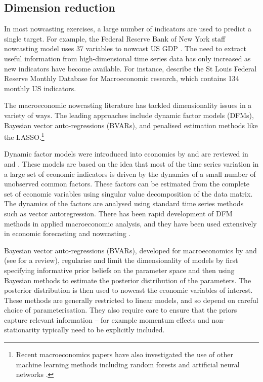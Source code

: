 \documentclass[a4paper, 12pt]{article}
\theoremstyle{remark}
\begin{document}
\subsection{Dimension reduction} \label{subsec:dimension}

In most nowcasting exercises, a large number of indicators are used to predict a single target.
For example, the Federal Reserve Bank of New York staff nowcasting model uses 37 variables to nowcast US GDP \citep{FRBNY}. The need to extract useful information from high-dimensional time series data has only increased as new indicators have become available. For instance, \citet{mccracken2016fred} describe the St Louis Federal Reserve Monthly Database for Macroeconomic research, which contains 134 monthly US indicators.

The macroeconomic nowcasting literature has tackled dimensionality issues in a variety of ways. The leading approaches include dynamic factor models (DFMs), Bayesian vector auto-regressions (BVARs), and penalised estimation methods like the LASSO.\footnote{Recent macroeconomics papers have also investigated the use of other machine learning methods including random forests and artificial neural networks \citep{richardson2021nowcasting}.} 

Dynamic factor models were introduced into economics by \citet{Geweke1977} and are reviewed in \citet{StockWatson2010} and \citet{BaiNg2008}. These models are based on the idea that most of the time series variation in a large set of economic indicators is driven by the dynamics of a small number of unobserved common factors. These factors can be estimated from the complete set of economic variables using singular value decomposition of the data matrix. The dynamics of the factors are analysed using standard time series methods such as vector autoregression. There has been rapid development of DFM methods in applied macroeconomic analysis, and they have been used extensively in economic forecasting and nowcasting \citep{GiannoneReichlinSmall2006,doz2006,bok2018macroeconomic}.

Bayesian vector auto-regressions (BVARs), developed for macroeconomics by \citet{litterman1979techniques} and \citet{sims1980macroeconomics} (see \citet{karlsson2013forecasting} for a review), regularise and limit the dimensionality of models by first specifying informative prior beliefs on the parameter space and then using Bayesian methods to estimate the posterior distribution of the parameters. The posterior distribution is then used to nowcast the economic variables of interest. These methods are generally restricted to linear models, and so depend on careful choice of parameterisation.
They also require care to ensure that the priors capture relevant information -- for example momentum effects and non-stationarity typically need to be explicitly included.
\end{document}
